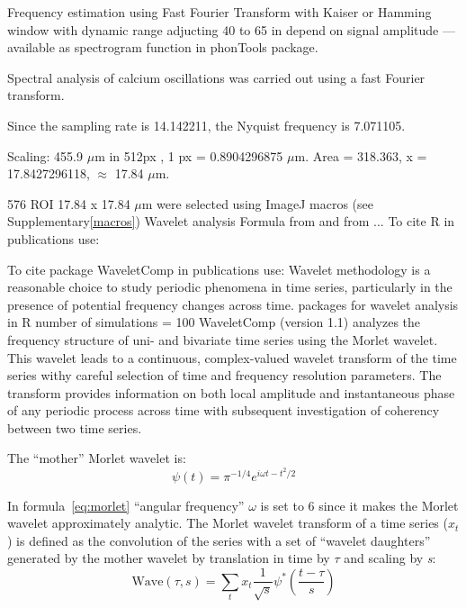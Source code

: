 \documentclass{biophys-new}
\begin{document}
Frequency estimation using Fast Fourier Transform with Kaiser or Hamming window with dynamic range adjucting 40 to 65 in depend on signal amplitude --- available as spectrogram function in phonTools package.

Spectral analysis of calcium oscillations was carried out using a fast Fourier transform.

Since the sampling rate is 14.142211, the Nyquist frequency is 7.071105.

Scaling: 455.9 $\mu$m in 512px , 1 px = 0.8904296875 $\mu$m.
Area = 318.363, x = 17.8427296118, $\approx$ 17.84 $\mu$m.


576 ROI 17.84 x 17.84 $\mu$m were selected using ImageJ macros (see Supplementary\ref{macros})
Wavelet analysis
Formula from \cite{grinsted2004application} and from \cite{kahraman2016multiple} ...
To cite R in publications use:  \cite{team2014r}

To cite package WaveletComp in publications use: \cite{rosch2016waveletcomp}
Wavelet methodology is a reasonable choice to study periodic phenomena in time series, particularly in
the presence of potential frequency changes across time.
packages for wavelet analysis in R
number of simulations = 100
WaveletComp (version 1.1) analyzes the frequency structure of uni- and bivariate time series using the Morlet wavelet.
This wavelet leads to a continuous, complex-valued wavelet transform of the time series withy careful selection of time and frequency resolution parameters. The transform provides information on both local amplitude and instantaneous phase of any periodic process across time with subsequent investigation of coherency between two time series.


The “mother” Morlet wavelet is:
\begin{equation}\label{eq:morlet}
\psi(t)=\pi^{-1/4}e^{i\omega t-{t^2}/2}
\end{equation}


In formula~\ref{eq:morlet} “angular frequency” $\omega$ is set to 6 since it makes the Morlet wavelet approximately analytic.
The Morlet wavelet transform of a time series (${x}_{t}$) is defined as the convolution of the series with a set of “wavelet daughters” generated by the mother wavelet by translation in time by $\tau$ and scaling by \textit{s}:
\begin{equation}\label{eq:wave}
\text{Wave}(\tau, s)=\sum_{t}x_{t}\frac{1}{\sqrt{s}}\psi^{\ast}\left(\frac{t-\tau}{s}\right)
\end{equation}
\end{document}
